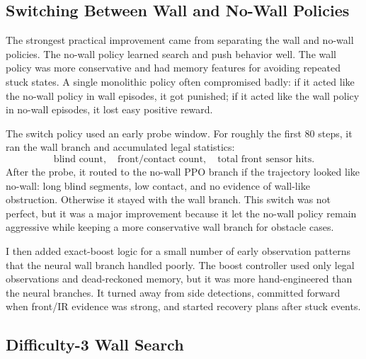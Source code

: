 \documentclass[11pt]{article}
\begin{document}
\subsection{Switching Between Wall and No-Wall Policies}

The strongest practical improvement came from separating the wall and no-wall policies.
The no-wall policy learned search and push behavior well. The wall policy was more
conservative and had memory features for avoiding repeated stuck states. A single
monolithic policy often compromised badly: if it acted like the no-wall policy in wall
episodes, it got punished; if it acted like the wall policy in no-wall episodes, it lost
easy positive reward.

The switch policy used an early probe window. For roughly the first 80 steps, it ran the
wall branch and accumulated legal statistics:
\[
  \text{blind count},\quad
  \text{front/contact count},\quad
  \text{total front sensor hits}.
\]
After the probe, it routed to the no-wall PPO branch if the trajectory looked like
no-wall: long blind segments, low contact, and no evidence of wall-like obstruction.
Otherwise it stayed with the wall branch. This switch was not perfect, but it was a
major improvement because it let the no-wall policy remain aggressive while keeping a
more conservative wall branch for obstacle cases.

I then added exact-boost logic for a small number of early observation patterns that the
neural wall branch handled poorly. The boost controller used only legal observations and
dead-reckoned memory, but it was more hand-engineered than the neural branches. It
turned away from side detections, committed forward when front/IR evidence was strong,
and started recovery plans after stuck events.

\subsection{Difficulty-3 Wall Search}
\end{document}

